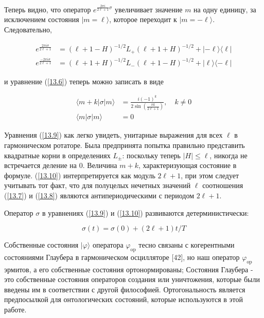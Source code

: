 \documentclass[main.tex]{subfiles}
\begin{document}
Теперь видно, что оператор $e^{\frac{2\pi i}{2\ell + 1}\sigma}$ увеличивает значение $m$ на одну единицу, за исключением состояния $| m = \ell\rangle$, которое переходит к $| m = - \ell\rangle$. Следовательно,

\begin{equation}\label{13.9}
	\begin{aligned} e^{\frac{2 \pi i \sigma}{2 \ell+1}} &=(\ell+1-H)^{-1 / 2} L_{+}(\ell+1+H)^{-1 / 2}+|-\ell\rangle\langle\ell| \\ e^{\frac{-2 \pi i \sigma}{2 \ell+1}} &=(\ell+1+H)^{-1 / 2} L_{-}(\ell+1-H)^{-1 / 2}+|\ell\rangle\langle-\ell| \end{aligned}
\end{equation}

и уравнение (\ref{13.6}) теперь можно записать в виде
 
\begin{equation}\label{13.10}
	\begin{aligned}\langle m+k|\sigma| m\rangle &=\frac{i(-1)^{k}}{2 \sin \left(\frac{\pi k}{2 \ell+1}\right)}, \quad k \neq 0 \\\langle m|\sigma| m\rangle &= 0 \end{aligned}
\end{equation}

Уравнения (\ref{13.9}) как легко увидеть, унитарные выражения для всех $\ell$ в гармоническом ротаторе. Была предпринята попытка правильно представить квадратные корни в определениях $L_\pm$: поскольку теперь $|H| \le \ell$, никогда не встречается деление на $0$. Величина $m + k$, характеризующая состояние в формуле. (\ref{13.10}) интерпретируется как модуль $2\ell + 1$, при этом следует учитывать тот факт, что для полуцелых нечетных значений $\ell$ соотношения (\ref{13.7}) и (\ref{13.8}) являются антипериодическими с периодом $2\ell + 1$.

Оператор $\sigma$ в уравнениях (\ref{13.9}) и (\ref{13.10}) развиваются детерминистически:

\begin{equation}\label{13.11}
	\sigma(t)=\sigma(0)+(2 \ell+1) t / T
\end{equation}

Собственные состояния $\mid\varphi\rangle$ оператора $\varphi_{\mathrm{op}}$ тесно связаны с когерентными состояниями Глаубера в гармоническом осцилляторе [42], но наш оператор $\varphi_{\mathrm{op}}$ эрмитов, а его собственные состояния ортонормированы; Состояния Глаубера - это собственные состояния операторов создания или уничтожения, которые были введены им в соответствии с другой философией. Ортогональность является предпосылкой для онтологических состояний, которые используются в этой работе.
\end{document}
